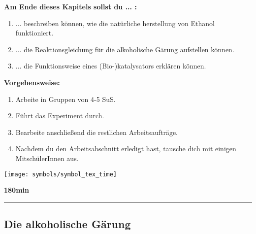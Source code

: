 \documentclass{scrartcl}  %
\begin{document}
			\begin{minipage}{0.7\textwidth}
				\noindent \textbf{Am Ende dieses Kapitels sollst du ... :}
				\begin{enumerate}
					\item ... beschreiben können, wie die natürliche herstellung von Ethanol funktioniert.
					\item ... die Reaktionsgleichung für die alkoholische Gärung aufstellen können.
					\item ... die Funktionsweise eines (Bio-)katalysators erklären können.
				\end{enumerate}
				\textbf{Vorgehensweise:}
				\begin{enumerate}
					\item Arbeite in Gruppen von 4-5 SuS.
					\item Führt das Experiment durch.
					\item Bearbeite anschließend die restlichen Arbeitsaufträge.
					\item Nachdem du den Arbeitsabschnitt erledigt hast, tausche dich mit einigen MitschülerInnen aus. 
				\end{enumerate}
				
			\end{minipage}
			\hspace{0.1\textwidth}
			\begin{minipage}{0.2\textwidth}
				\begin{tcolorbox}
					[enhanced,
					width=0.9\textwidth,
					colback=white,
					colframe=black,
					fonttitle=\sffamily\bfseries\large, 
					title=Zeit,  %
					attach boxed title to top center={xshift=-0.0mm,yshift=-0.50mm},
					boxed title style={skin=enhancedfirst jigsaw,size=small,arc=1mm,bottom=-1mm,colframe=black,height=0.75cm},
					colbacktitle=black,
					drop lifted shadow]
					\centering
					\texttt{[image: symbols/symbol\_tex\_time]}
					
					\begin{center}
						\textbf{180min}
					\end{center}
				\end{tcolorbox}
			\end{minipage}
			
			\begin{center}
				\noindent\rule{18cm}{0.1pt}
			\end{center}
			
\newpage
			\subsection{Die alkoholische Gärung}
			
\end{document}
